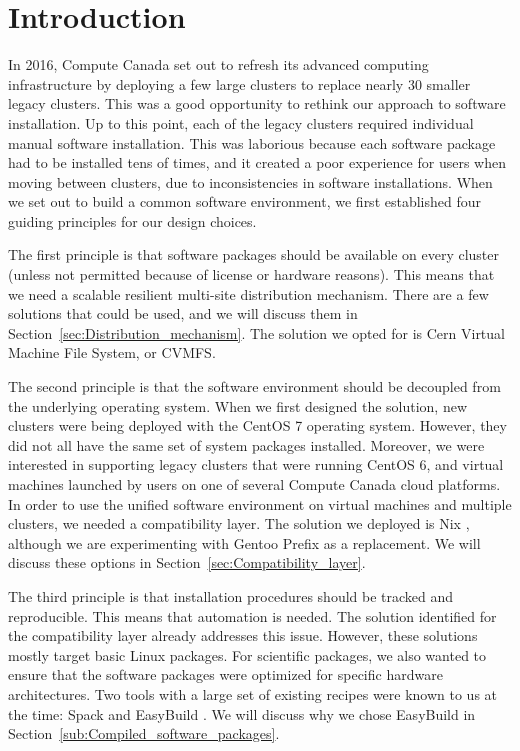 \documentclass[sigconf]{acmart}
\begin{document}
%

\section{Introduction}
\label{sec:Introduction}
In 2016, Compute Canada set out to refresh its advanced computing infrastructure by deploying a few large clusters to replace nearly 30 smaller legacy clusters. This was a good opportunity to rethink our approach to software installation. Up to this point, each of the legacy clusters required individual manual software installation. This was laborious because each software package had to be installed tens of times, and it created a poor experience for users when moving between clusters, due to inconsistencies in software installations. When we set out to build a common software environment, we first established four guiding principles for our design choices.

The first principle is that software packages should be available on every cluster (unless not permitted because of license or hardware reasons). This means that we need a scalable resilient multi-site distribution mechanism. There are a few solutions that could be used, and we will discuss them in Section~\ref{sec:Distribution_mechanism}. The solution we opted for is Cern Virtual Machine File System, or CVMFS\cite{CVMFS}.

The second principle is that the software environment should be decoupled from the underlying operating system. When we first designed the solution, new clusters were being deployed with the CentOS 7 operating system. However, they did not all have the same set of system packages installed. Moreover, we were interested in supporting legacy clusters that were running CentOS 6, and virtual machines launched by users on one of several Compute Canada cloud platforms. In order to use the unified software environment on virtual machines and multiple clusters, we needed a compatibility layer. The solution we deployed is Nix \cite{Nix}, although we are experimenting with Gentoo Prefix \cite{Gentoo} as a replacement. We will discuss these options in Section~\ref{sec:Compatibility_layer}.

The third principle is that installation procedures should be tracked and reproducible. This means that automation is needed. The solution identified for the compatibility layer already addresses this issue. However, these solutions mostly target basic Linux packages. For scientific packages, we also wanted to ensure that the software packages were optimized for specific hardware architectures. Two tools with a large set of existing recipes were known to us at the time: Spack\cite{Spack} and EasyBuild \cite{EasyBuild2012,EasyBuild2014,EasyBuild2016}. We will discuss why we chose EasyBuild in Section~\ref{sub:Compiled_software_packages}.
\end{document}
